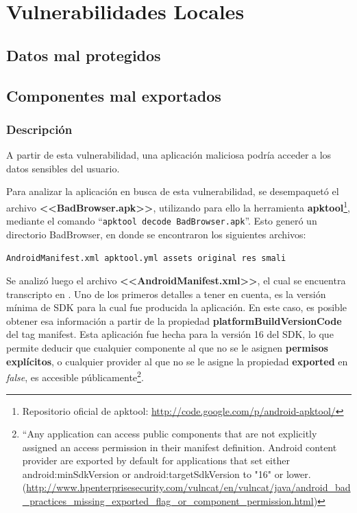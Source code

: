 \documentclass[11pt, a4paper, twoside]{article}
\begin{document}
\clearpage{\pagestyle{empty}}

\clearpage{%
  \pagestyle{empty}\tableofcontents%
  \vspace{3cm}%
  \cleardoublepage%
}
\setcounter{page}{1}

%
%
\section{Vulnerabilidades Locales}
\subsection{Datos mal protegidos}
\subsection{Componentes mal exportados}
\subsubsection{Descripción}
A partir de esta vulnerabilidad, una aplicación maliciosa podría 
acceder a los datos sensibles del usuario. 

Para analizar la aplicación en busca de esta vulnerabilidad, se desempaquetó el archivo \textbf{<<BadBrowser.apk>>}, utilizando para ello la herramienta \textbf{apktool}\footnote{Repositorio oficial de apktool: \url{http://code.google.com/p/android-apktool/}}, mediante el comando ``\texttt{apktool decode BadBrowser.apk}''. Esto generó un directorio BadBrowser, en donde se encontraron los siguientes archivos:
\begin{center}
\texttt{AndroidManifest.xml apktool.yml assets original res smali}
\end{center}

Se analizó luego el archivo \textbf{<<AndroidManifest.xml>>}, el cual se encuentra transcripto en . Uno de los primeros detalles a tener en cuenta, es la versión mínima de SDK para la cual fue producida la aplicación. En este caso, es posible obtener esa información a partir de la propiedad {\color{red}\textbf{platformBuildVersionCode}} del tag manifest. Esta aplicación fue hecha para la versión 16 del SDK, lo que permite deducir que cualquier componente al que no se le asignen \textbf{permisos explícitos}, o cualquier provider al que no se le asigne la propiedad \textbf{exported} en \emph{false}, es accesible públicamente\footnote{``Any application can access public components that are not explicitly assigned an access permission in their manifest definition. Android content provider are exported by default for applications that set either android:minSdkVersion or android:targetSdkVersion to "16" or lower. (\url{http://www.hpenterprisesecurity.com/vulncat/en/vulncat/java/android_bad_practices_missing_exported_flag_or_component_permission.html})}.
\end{document}
